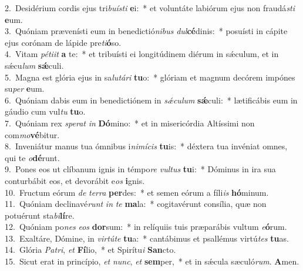 {2.~}Desidérium cordis ejus tri\textit{bu}\textit{í}\textit{sti} \textbf{e}i:~* et voluntáte labiórum ejus non fraudá\textit{sti} \textbf{e}um.\\
{3.~}Quóniam prævenísti eum in benedictió\textit{ni}\textit{bus} \textit{dul}\textbf{cé}dinis:~* posuísti in cápite ejus corónam de lápide pre\textit{ti}\textbf{ó}so.\\
{4.~}Vitam \textit{pé}\textit{ti}\textit{it} \textbf{a} te:~* et tribuísti ei longitúdinem diérum in sǽculum, et in sǽcu\textit{lum} \textbf{sǽ}culi.\\
{5.~}Magna est glória ejus in sa\textit{lu}\textit{tá}\textit{ri} \textbf{tu}o:~* glóriam et magnum decórem impónes su\textit{per} \textbf{e}um.\\
{6.~}Quóniam dabis eum in benedictiónem in \textit{sǽ}\textit{cu}\textit{lum} \textbf{sǽ}culi:~* lætificábis eum in gáudio cum vul\textit{tu} \textbf{tu}o.\\
{7.~}Quóniam rex \textit{spe}\textit{rat} \textit{in} \textbf{Dó}mino:~* et in misericórdia Altíssimi non com\textit{mo}\textbf{vé}bitur.\\
{8.~}Inveniátur manus tua ómnibus i\textit{ni}\textit{mí}\textit{cis} \textbf{tu}is:~* déxtera tua invéniat omnes, qui te \textit{o}\textbf{dé}runt.\\
{9.~}Pones eos ut clíbanum ignis in témpo\textit{re} \textit{vul}\textit{tus} \textbf{tu}i:~* Dóminus in ira sua conturbábit eos, et devorábit e\textit{os} \textbf{i}gnis.\\
{10.~}Fructum eórum \textit{de} \textit{ter}\textit{ra} \textbf{per}des:~* et semen eórum a fíli\textit{is} \textbf{hó}minum.\\
{11.~}Quóniam declinavé\textit{runt} \textit{in} \textit{te} \textbf{ma}la:~* cogitavérunt consília, quæ non potuérunt sta\textit{bi}\textbf{lí}re.\\
{12.~}Quóniam po\textit{nes} \textit{e}\textit{os} \textbf{dor}sum:~* in relíquiis tuis præparábis vultum \textit{e}\textbf{ó}rum.\\
{13.~}Exaltáre, Dómine, in \textit{vir}\textit{tú}\textit{te} \textbf{tu}a:~* cantábimus et psallémus virtú\textit{tes} \textbf{tu}as.\\
{14.~}Glória \textit{Pa}\textit{tri}, \textit{et} \textbf{Fí}lio,~* et Spirítu\textit{i} \textbf{San}cto.\\
{15.~}Sicut erat in princípio, \textit{et} \textit{nunc}, \textit{et} \textbf{sem}per,~* et in sǽcula sæculó\textit{rum}. \textbf{A}men.\\
